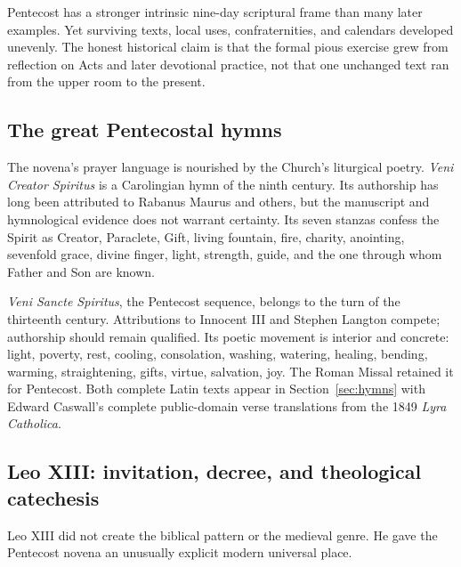 Pentecost has a stronger intrinsic nine-day scriptural frame than many later examples. Yet surviving texts, local uses, confraternities, and calendars developed unevenly. The honest historical claim is that the formal pious exercise grew from reflection on Acts and later devotional practice, not that one unchanged text ran from the upper room to the present.

\subsection{The great Pentecostal hymns}

The novena's prayer language is nourished by the Church's liturgical poetry. \textit{Veni Creator Spiritus} is a Carolingian hymn of the ninth century. Its authorship has long been attributed to Rabanus Maurus and others, but the manuscript and hymnological evidence does not warrant certainty. Its seven stanzas confess the Spirit as Creator, Paraclete, Gift, living fountain, fire, charity, anointing, sevenfold grace, divine finger, light, strength, guide, and the one through whom Father and Son are known.

\textit{Veni Sancte Spiritus}, the Pentecost sequence, belongs to the turn of the thirteenth century. Attributions to Innocent III and Stephen Langton compete; authorship should remain qualified. Its poetic movement is interior and concrete: light, poverty, rest, cooling, consolation, washing, watering, healing, bending, warming, straightening, gifts, virtue, salvation, joy. The Roman Missal retained it for Pentecost. Both complete Latin texts appear in Section~\ref{sec:hymns} with Edward Caswall's complete public-domain verse translations from the 1849 \textit{Lyra Catholica}.

\subsection{Leo XIII: invitation, decree, and theological catechesis}

Leo XIII did not create the biblical pattern or the medieval genre. He gave the Pentecost novena an unusually explicit modern universal place.

